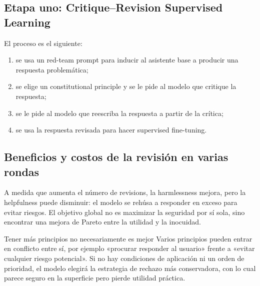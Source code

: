 \documentclass[a4paper]{article}
\begin{document}
\subsection{Etapa uno: Critique--Revision Supervised Learning}

El proceso es el siguiente:

\begin{enumerate}
    \item se usa un red-team prompt para inducir al asistente base a producir una respuesta problemática;
    \item se elige un constitutional principle y se le pide al modelo que critique la respuesta;
    \item se le pide al modelo que reescriba la respuesta a partir de la crítica;
    \item se usa la respuesta revisada para hacer supervised fine-tuning.
\end{enumerate}




\subsection{Beneficios y costos de la revisión en varias rondas}

A medida que aumenta el número de revisions, la harmlessness mejora, pero la helpfulness puede disminuir: el modelo se rehúsa a responder en exceso para evitar riesgos. El objetivo global no es maximizar la seguridad por sí sola, sino encontrar una mejora de Pareto entre la utilidad y la inocuidad.


\begin{warningbox}{Tener más principios no necesariamente es mejor}
Varios principios pueden entrar en conflicto entre sí, por ejemplo «procurar responder al usuario» frente a «evitar cualquier riesgo potencial». Si no hay condiciones de aplicación ni un orden de prioridad, el modelo elegirá la estrategia de rechazo más conservadora, con lo cual parece seguro en la superficie pero pierde utilidad práctica.
\end{warningbox}
\end{document}
